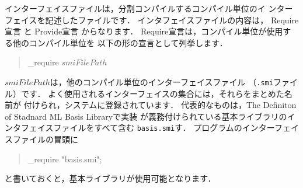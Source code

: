 \documentclass{jbook}
\newenvironment{program}{\begin{tt}\begin{quote}}{\end{quote}\end{tt}}
\begin{document}
	インターフェイスファイルは，分割コンパイルするコンパイル単位のイ
ンターフェイスを記述したファイルです．
	インタフェイスファイルの内容は，
Require宣言
と
Provide宣言
からなります．
	Require宣言は，コンパイル単位が使用する他のコンパイル単位を
以下の形の宣言として列挙します．
\begin{program}
\_require $smiFilePath$
\end{program}
	$smiFilePath$は，他のコンパイル単位のインターフェイスファイル
（{\tt .smi}ファイル）です．
	よく使用されるインターフェイスの集合には，それらをまとめた名前が
付けられ，システムに登録されています．
	代表的なものは，The Definiton of Stadnard ML Basis Libraryで実装
が義務付けられている基本ライブラリのインタフェイスファイルをすべて含む
{\tt basis.smi}す．
	プログラムのインターフェイスファイルの冒頭に
\begin{program}
\_require "basis.smi";
\end{program}
と書いておくと，基本ライブラリが使用可能となります．
\end{document}
